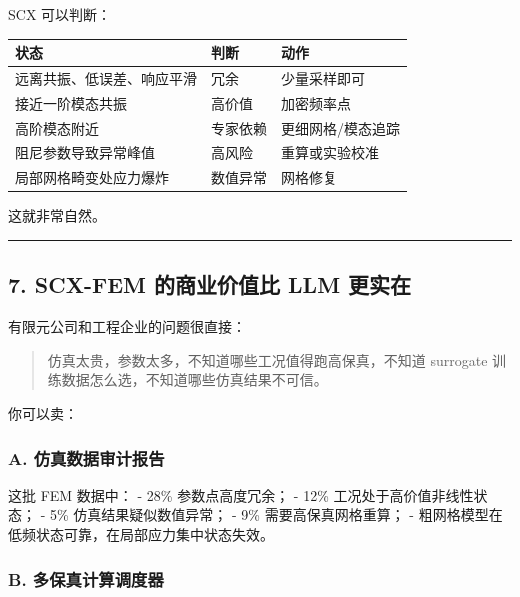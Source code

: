 \documentclass[
  12pt,
]{ctexart}
\newenvironment{Shaded}{}{}
\newcommand{\NormalTok}[1]{#1}
\begin{document}
SCX 可以判断：

\begin{longtable}[]{@{}lll@{}}
\toprule\noalign{}
状态 & 判断 & 动作 \\
\midrule\noalign{}
\endhead
\bottomrule\noalign{}
\endlastfoot
远离共振、低误差、响应平滑 & 冗余 & 少量采样即可 \\
接近一阶模态共振 & 高价值 & 加密频率点 \\
高阶模态附近 & 专家依赖 & 更细网格/模态追踪 \\
阻尼参数导致异常峰值 & 高风险 & 重算或实验校准 \\
局部网格畸变处应力爆炸 & 数值异常 & 网格修复 \\
\end{longtable}

这就非常自然。

\begin{center}\rule{0.5\linewidth}{0.5pt}\end{center}

\subsection{7. SCX-FEM 的商业价值比 LLM
更实在}\label{scx-fem-ux7684ux5546ux4e1aux4ef7ux503cux6bd4-llm-ux66f4ux5b9eux5728}

有限元公司和工程企业的问题很直接：

\begin{quote}
仿真太贵，参数太多，不知道哪些工况值得跑高保真，不知道 surrogate
训练数据怎么选，不知道哪些仿真结果不可信。
\end{quote}

你可以卖：

\subsubsection{A.
仿真数据审计报告}\label{a.-ux4effux771fux6570ux636eux5ba1ux8ba1ux62a5ux544a}

\begin{Shaded}
\begin{Highlighting}[]
\NormalTok{这批 FEM 数据中：}
\NormalTok{{-} 28\% 参数点高度冗余；}
\NormalTok{{-} 12\% 工况处于高价值非线性状态；}
\NormalTok{{-} 5\% 仿真结果疑似数值异常；}
\NormalTok{{-} 9\% 需要高保真网格重算；}
\NormalTok{{-} 粗网格模型在低频状态可靠，在局部应力集中状态失效。}
\end{Highlighting}
\end{Shaded}

\subsubsection{B.
多保真计算调度器}\label{b.-ux591aux4fddux771fux8ba1ux7b97ux8c03ux5ea6ux5668}
\end{document}
